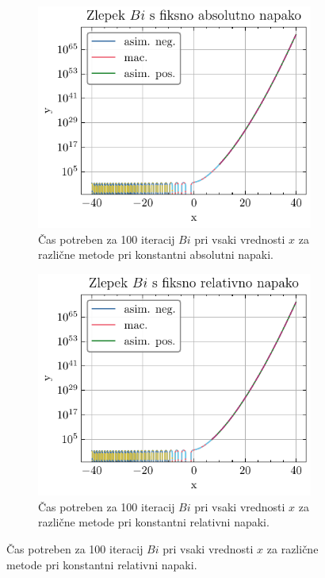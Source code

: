 \documentclass[slovene,11pt,a4paper]{article}
\begin{document}
\begin{figure}[H]
  \begin{subfigure}{0.43\textwidth}
    \centering
    \includegraphics[width=\linewidth]{graphs/zlepek_bi_abs.pdf}
    \caption{Čas potreben za 100 iteracij $Bi$ pri vsaki vrednosti $x$ za različne metode pri konstantni absolutni napaki.}
  \end{subfigure}\hfill
  \begin{subfigure}{0.43\textwidth}
    \centering
    \includegraphics[width=\linewidth]{graphs/zlepek_bi_rel.pdf}
    \caption{Čas potreben za 100 iteracij $Bi$ pri vsaki vrednosti $x$ za različne metode pri konstantni relativni napaki.}
  \end{subfigure}
\end{figure}
\end{document}
